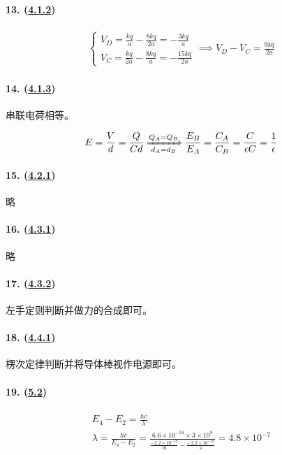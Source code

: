 \paragraph{13. (\hyperref[subsec:4.1.2]{4.1.2})}

\begin{gather*}
    \begin{cases}
        V_D=\frac{kq}{a}-\frac{8kq}{2a}=-\frac{3kq}{a}\\
        V_C=\frac{kq}{2a}-\frac{8kq}{a}=-\frac{15kq}{2a}
    \end{cases}\implies
    V_D-V_C=\frac{9kq}{2a}
\end{gather*}

\paragraph{14. (\hyperref[subsec:4.1.3]{4.1.3})} 串联电荷相等。

\begin{equation*}
    E=\frac{V}{d}=\frac{Q}{Cd}\xRightarrow[d_A=d_B]{Q_A=Q_B}
    \frac{E_B}{E_A}=\frac{C_A}{C_B}=\frac{C}{\epsilon C}=\frac1\epsilon
\end{equation*}

\paragraph{15. (\hyperref[subsec:4.2.1]{4.2.1})} 略
\paragraph{16. (\hyperref[subsec:4.3.1]{4.3.1})} 略
\paragraph{17. (\hyperref[subsec:4.3.2]{4.3.2})} 左手定则判断并做力的合成即可。
\paragraph{18. (\hyperref[subsec:4.4.1]{4.4.1})} 楞次定律判断并将导体棒视作电源即可。
\paragraph{19. (\hyperref[sec:5.2]{5.2})}

\begin{gather*}
    E_4-E_2=\frac{hc}{\lambda}\\
    \lambda=\frac{hc}{E_4-E_2}
    =\frac{6.6\times10^{-34}\times3\times10^8}{\frac{-2.2\times10^{-18}}{16}-\frac{-2.2\times10^{-18}}{4}}
    =4.8\times10^{-7}
\end{gather*}
